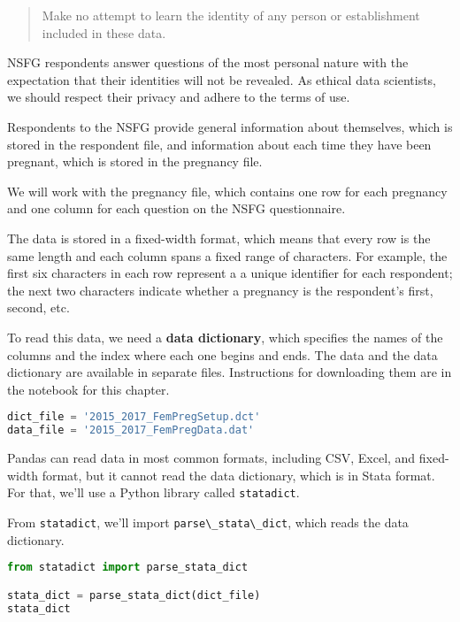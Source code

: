 \begin{quote}
Make no attempt to learn the identity of any person or establishment
included in these data.
\end{quote}

NSFG respondents answer questions of the most personal nature with the
expectation that their identities will not be revealed. As ethical data
scientists, we should respect their privacy and adhere to the terms of
use.

Respondents to the NSFG provide general information about themselves,
which is stored in the respondent file, and information about each time
they have been pregnant, which is stored in the pregnancy file.

We will work with the pregnancy file, which contains one row for each
pregnancy and one column for each question on the NSFG questionnaire.

The data is stored in a fixed-width format, which means that every row
is the same length and each column spans a fixed range of characters.
For example, the first six characters in each row represent a a unique
identifier for each respondent; the next two characters indicate whether
a pregnancy is the respondent's first, second, etc.

To read this data, we need a \textbf{data dictionary}, which specifies
the names of the columns and the index where each one begins and ends.
The data and the data dictionary are available in separate files.
Instructions for downloading them are in the notebook for this chapter.

\begin{lstlisting}[language=Python,style=source]
dict_file = '2015_2017_FemPregSetup.dct'
data_file = '2015_2017_FemPregData.dat'
\end{lstlisting}

Pandas can read data in most common formats, including CSV, Excel, and
fixed-width format, but it cannot read the data dictionary, which is in
Stata format. For that, we'll use a Python library called
\passthrough{\lstinline!statadict!}.

\pagebreak

From \passthrough{\lstinline!statadict!}, we'll import
\passthrough{\lstinline!parse\_stata\_dict!}, which reads the data
dictionary.

\begin{lstlisting}[language=Python,style=source]
from statadict import parse_stata_dict

stata_dict = parse_stata_dict(dict_file)
stata_dict
\end{lstlisting}


